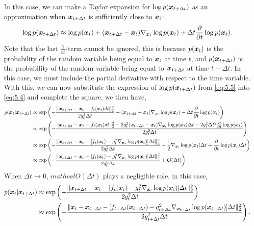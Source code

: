 In this case, we can make a Taylor expansion for $\log p(\bm{x}_{t+\Delta t})$ as an approximation when $\bm{x}_{t+\Delta t}$ is sufficiently close to $\bm{x}_t$:
\begin{equation}
    \label{eq:5.5}
    \log p(\bm{x}_{t+\Delta t})\approx \log p(\bm{x}_t)+ (\bm{x}_{t+\Delta t}-\bm{x}_t)\nabla _{\bm{x}_t}\log p(\bm{x}_t)+ \Delta t\frac{\partial}{\partial t}\log p(\bm{x}_t).
\end{equation}
Note that the last $\frac{\partial}{\partial t}$-term cannot be ignored, this is because $p(\bm{x}_t)$ is the probability of the random variable being equal to $\bm{x}_t$ at time $t$, and $p(\bm{x}_{t+\Delta t})$ is the probability of the random variable being equal to $\bm{x}_{t+\Delta t}$ at time $t+\Delta t$. In this case, we must include the partial derivative with respect to the time variable. With this, we can now substitute the expression of $\log p(\bm{x}_{t+\Delta t})$ from \cref{eq:5.5} into \cref{eq:5.4} and complete the square, we then have,
\begin{align}
    p(\bm{x}_{t}|\bm{x}_{t+\Delta t}) &\propto \exp \left(  -\frac{\| \bm{x}_{t+\Delta t}-\bm{x}_{t}-f_t(\bm{x}_{t})dt\|_2^2}{2g_t^2\Delta t} -  (\bm{x}_{t+\Delta t}-\bm{x}_t)\nabla _{\bm{x}_t}\log p(\bm{x}_t)-\Delta t\frac{\partial}{\partial t}\log p(\bm{x}_t) \right)  \nonumber\\
    &\propto \exp\left(-\frac{\| \bm{x}_{t+\Delta t}-\bm{x}_{t}-f_t(\bm{x}_{t})dt\|_2^2-2g_t^2(\bm{x}_{t+\Delta t}-\bm{x}_t)\nabla _{\bm{x}_t}\log p(\bm{x}_t)\Delta t-2g_t^2\Delta t^2 \frac{\partial}{\partial t}\log p(\bm{x}_{t})  }{2g_t^2\Delta t}\right)  \nonumber \\
    &\propto\exp\left(-\frac{\| \bm{x}_{t+\Delta t}-\bm{x}_{t}-[f_t(\bm{x}_{t})-g_t^2 \nabla_{\bm{x}_{t}} \log p(\bm{x}_{t})]\Delta t\|_2^2}{2g_t^2\Delta t} -\frac{1}{2}\nabla_{\bm{x}_{t}}\log p(\bm{x}_{t})\Delta t+\frac{\partial}{\partial t}\log p(\bm{x}_{t})\Delta t  \right)\nonumber\\
    &\propto \exp\left(-\frac{\| \bm{x}_{t+\Delta t}-\bm{x}_{t}-[f_t(\bm{x}_{t})-g_t^2 \nabla_{\bm{x}_{t}} \log p(\bm{x}_{t})]\Delta t\|_2^2}{2g_t^2\Delta t}+\mathcal{O}(\Delta t)\right). \label{eq:5.6}
\end{align}
When $\Delta t\to 0$, $mathcal{O}(\Delta t)$ plays a negligible role, in this case,
\begin{align}
    p(\bm{x}_{t}|\bm{x}_{t+\Delta t}) &\approx  \exp\left(-\frac{\| \bm{x}_{t+\Delta t}-\bm{x}_{t}-[f_t(\bm{x}_{t})-g_t^2 \nabla_{\bm{x}_{t}} \log p(\bm{x}_{t})]\Delta t\|_2^2}{2g_t^2\Delta t}\right) \nonumber\\
    &\approx \exp\left(-\frac{\|\bm{x}_{t}- \bm{x}_{t+\Delta t}-[f_{t+\Delta t}(\bm{x}_{t+\Delta t})-g_{t+\Delta t}^2 \nabla_{\bm{x}_{t+\Delta t}} \log p(\bm{x}_{t+\Delta t})]\Delta t\|_2^2}{2g_{t+\Delta t}^2\Delta t}\right).\label{eq:5.7}
\end{align}
